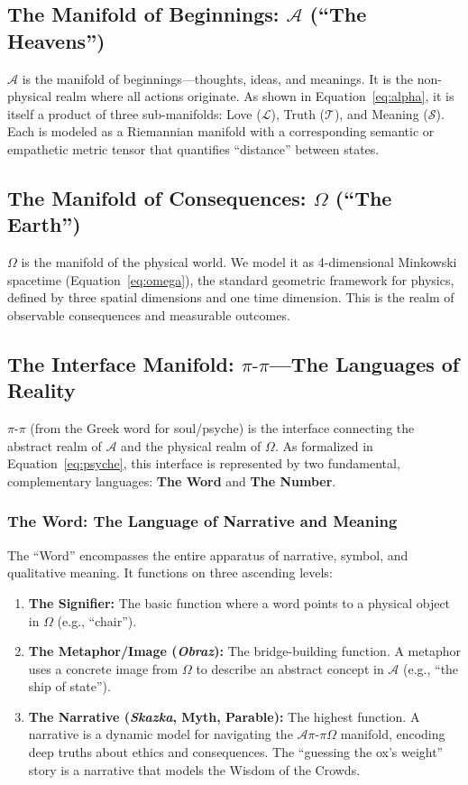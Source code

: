 \documentclass[11pt,a4paper]{article}
\begin{document}
\subsection{The Manifold of Beginnings: \texorpdfstring{$\mathcal{A}$}{Alpha} (``The Heavens'')}
$\mathcal{A}$ is the manifold of beginnings—thoughts, ideas, and meanings. It is the non-physical realm where all actions originate. As shown in Equation~\eqref{eq:alpha}, it is itself a product of three sub-manifolds: Love ($\mathcal{L}$), Truth ($\mathcal{T}$), and Meaning ($\mathcal{S}$). Each is modeled as a Riemannian manifold with a corresponding semantic or empathetic metric tensor that quantifies ``distance'' between states.

\subsection{The Manifold of Consequences: \texorpdfstring{$\Omega$}{Omega} (``The Earth'')}
$\Omega$ is the manifold of the physical world. We model it as 4-dimensional Minkowski spacetime (Equation~\eqref{eq:omega}), the standard geometric framework for physics, defined by three spatial dimensions and one time dimension. This is the realm of observable consequences and measurable outcomes.

\subsection{The Interface Manifold: \texorpdfstring{$\pi\text{-}\pi$}{Psyche}—The Languages of Reality}
$\pi\text{-}\pi$ (from the Greek word for soul/psyche) is the interface connecting the abstract realm of $\mathcal{A}$ and the physical realm of $\Omega$. As formalized in Equation~\eqref{eq:psyche}, this interface is represented by two fundamental, complementary languages: \textbf{The Word} and \textbf{The Number}.

\subsubsection{The Word: The Language of Narrative and Meaning}
The ``Word'' encompasses the entire apparatus of narrative, symbol, and qualitative meaning. It functions on three ascending levels:

\begin{enumerate}
    \item \textbf{The Signifier:} The basic function where a word points to a physical object in $\Omega$ (e.g., ``chair'').
    \item \textbf{The Metaphor/Image (\textit{Obraz}):} The bridge-building function. A metaphor uses a concrete image from $\Omega$ to describe an abstract concept in $\mathcal{A}$ (e.g., ``the ship of state'').
    \item \textbf{The Narrative (\textit{Skazka}, Myth, Parable):} The highest function. A narrative is a dynamic model for navigating the $\mathcal{A}\pi\text{-}\pi\Omega$ manifold, encoding deep truths about ethics and consequences. The ``guessing the ox's weight'' story is a narrative that models the Wisdom of the Crowds.
\end{enumerate}
\end{document}
